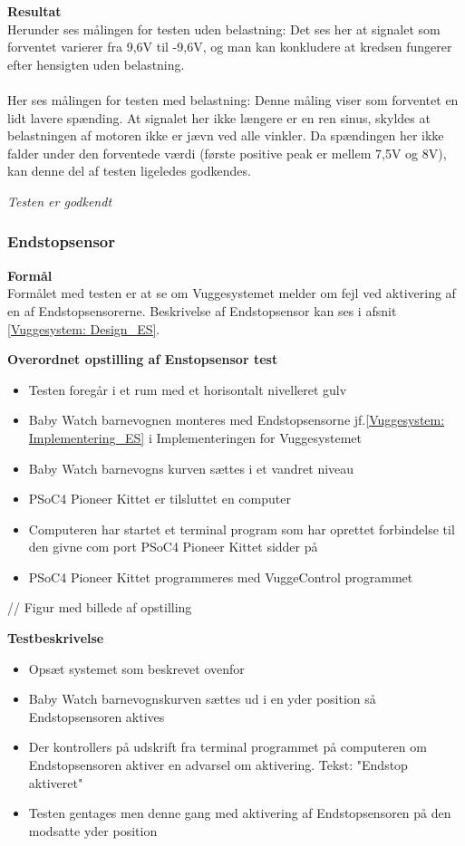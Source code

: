 \textbf{Resultat} \\
Herunder ses målingen for testen uden belastning:
Det ses her at signalet som forventet varierer fra 9,6V til -9,6V, og man kan konkludere at kredsen fungerer efter hensigten uden belastning.\\
\\
Her ses målingen for testen med belastning:
Denne måling viser som forventet en lidt lavere spænding. At signalet her ikke længere er en ren sinus, skyldes at belastningen af motoren ikke er jævn ved alle vinkler. Da spændingen her ikke falder under den forventede værdi (første positive peak er mellem 7,5V og 8V), kan denne del af testen ligeledes godkendes.

\textit{Testen er godkendt}

\subsubsection{Endstopsensor}
\textbf{Formål} \\
Formålet med testen er at se om Vuggesystemet melder om fejl ved aktivering af en af Endstopsensorerne. Beskrivelse af Endstopsensor kan ses i afsnit \vref{Vuggesystem: Design_ES}.

\textbf{Overordnet opstilling af Enstopsensor test}

\begin{itemize}
	\item Testen foregår i et rum med et horisontalt nivelleret gulv
	\item Baby Watch barnevognen monteres med Endstopsensorne jf.\vref{Vuggesystem: Implementering_ES} i Implementeringen for Vuggesystemet 
	\item Baby Watch barnevogns kurven sættes i et vandret niveau
	\item PSoC4 Pioneer Kittet er tilsluttet en computer
	\item Computeren har startet et terminal program som har oprettet forbindelse til den givne com port PSoC4 Pioneer Kittet sidder på
	\item PSoC4 Pioneer Kittet programmeres med VuggeControl programmet
\end{itemize}

// Figur med billede af opstilling

\textbf{Testbeskrivelse}
\begin{itemize}
	\item Opsæt systemet som beskrevet ovenfor
	\item Baby Watch barnevognskurven sættes ud i en yder position så Endstopsensoren aktives
	\item Der kontrollers på udskrift fra terminal programmet på computeren om Endstopsensoren aktiver en advarsel om aktivering. Tekst: "Endstop aktiveret"
	\item Testen gentages men denne gang med aktivering af Endstopsensoren på den modsatte yder position
\end{itemize}


